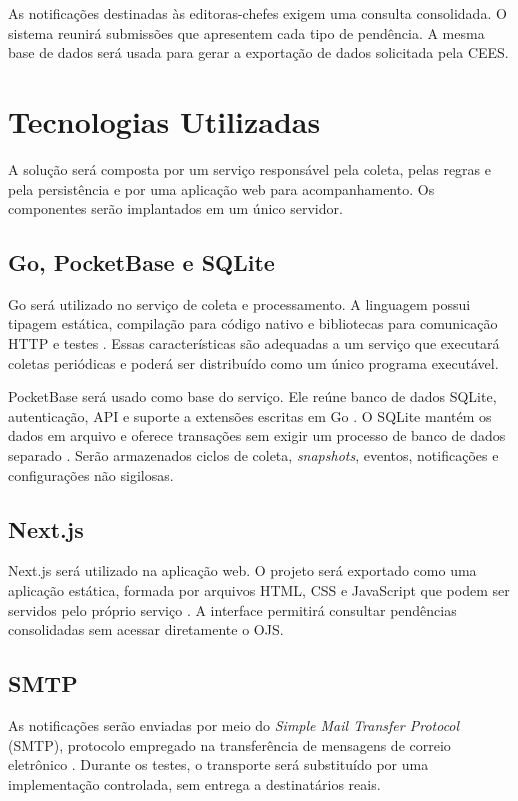 As notificações destinadas às editoras-chefes exigem uma consulta consolidada. O sistema reunirá submissões que apresentem cada tipo de pendência. A mesma base de dados será usada para gerar a exportação de dados solicitada pela CEES.

\section{Tecnologias Utilizadas}
\label{sec-fundteo-tecnologias}

A solução será composta por um serviço responsável pela coleta, pelas regras e pela persistência e por uma aplicação web para acompanhamento. Os componentes serão implantados em um único servidor.

\subsection{Go, PocketBase e SQLite}

Go será utilizado no serviço de coleta e processamento. A linguagem possui tipagem estática, compilação para código nativo e bibliotecas para comunicação HTTP e testes \cite{golangdocs}. Essas características são adequadas a um serviço que executará coletas periódicas e poderá ser distribuído como um único programa executável.

PocketBase será usado como base do serviço. Ele reúne banco de dados SQLite, autenticação, API e suporte a extensões escritas em Go \cite{pocketbasedocs}. O SQLite mantém os dados em arquivo e oferece transações sem exigir um processo de banco de dados separado \cite{sqliteabout}. Serão armazenados ciclos de coleta, \textit{snapshots}, eventos, notificações e configurações não sigilosas.

\subsection{Next.js}

Next.js será utilizado na aplicação web. O projeto será exportado como uma aplicação estática, formada por arquivos HTML, CSS e JavaScript que podem ser servidos pelo próprio serviço \cite{nextjsstatic}. A interface permitirá consultar pendências consolidadas sem acessar diretamente o OJS.

\subsection{SMTP}

As notificações serão enviadas por meio do \textit{Simple Mail Transfer Protocol} (SMTP), protocolo empregado na transferência de mensagens de correio eletrônico \cite{rfc5321}. Durante os testes, o transporte será substituído por uma implementação controlada, sem entrega a destinatários reais.

